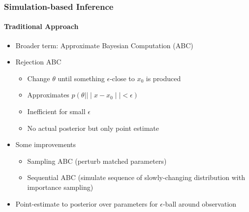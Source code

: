 \documentclass[9pt]{beamer}
\begin{document}
%



\begin{frame}
\frametitle{Simulation-based Inference}
\framesubtitle{Traditional Approach}
\begin{itemize}
	\item Broader term: Approximate Bayesian Computation (ABC)
		\item Rejection ABC
		\begin{itemize}
				\item Change $\theta$ until something $\epsilon$-close to $x_0$ is produced
				\item Approximates $p(\theta|\mid\mid x-x_0 \mid\mid < \epsilon)$
					\item Inefficient for small $\epsilon$
				\item No actual posterior but only point estimate
		\end{itemize}
	\item Some improvements
	\begin{itemize}
		\item Sampling ABC (perturb matched parameters) \cite{marjoram2003markov}
		\item Sequential ABC (simulate sequence of slowly-changing distribution with importance sampling) \cite{beaumont2009adaptive,bonassi2015sequential}
	\end{itemize}
	\item Point-estimate to posterior over parameters for $\epsilon$-ball around observation
	
\end{itemize}
\end{frame} 
\end{document}
